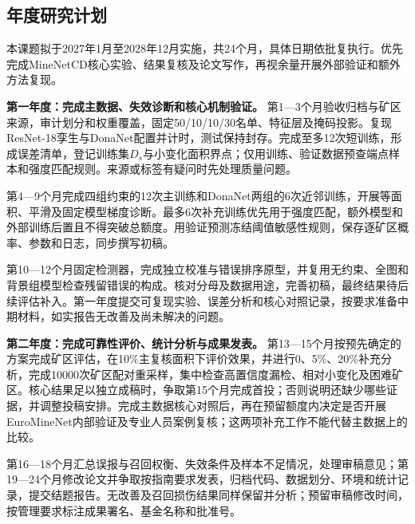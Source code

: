 \subsection{年度研究计划}
本课题拟于2027年1月至2028年12月实施，共24个月，具体日期依批复执行。优先完成MineNetCD核心实验、结果复核及论文写作，再视余量开展外部验证和额外方法复现。

\textbf{第一年度：完成主数据、失效诊断和核心机制验证。}
第1—3个月验收归档与矿区来源，审计划分和权重覆盖，固定50/10/10/30名单、特征层及掩码投影。复现ResNet-18孪生与DonaNet配置并计时，测试保持封存。完成至多12次短训练，形成误差清单，登记训练集$D_s$与小变化面积界点；仅用训练、验证数据预查端点样本和强度匹配规则。来源或标签有疑问时先处理质量问题。

第4—9个月完成四组约束的12次主训练和DonaNet两组的6次近邻训练，开展等面积、平滑及固定模型梯度诊断。最多6次补充训练优先用于强度匹配，额外模型和外部训练后置且不得突破总额度。用验证预测冻结阈值敏感性规则，保存逐矿区概率、参数和日志，同步撰写初稿。

第10—12个月固定检测器，完成独立校准与错误排序原型，并复用无约束、全图和背景组模型检查残留错误的构成。核对分母及数据用途，完善初稿，最终结果待后续评估补入。第一年度提交可复现实验、误差分析和核心对照记录，按要求准备中期材料，如实报告无改善及尚未解决的问题。

\textbf{第二年度：完成可靠性评价、统计分析与成果发表。}
第13—15个月按预先确定的方案完成矿区评估，在10\%主复核面积下评价效果，并进行0、5\%、20\%补充分析，完成10000次矿区配对重采样，集中检查高置信度漏检、相对小变化及困难矿区。核心结果足以独立成稿时，争取第15个月完成首投；否则说明还缺少哪些证据，并调整投稿安排。完成主数据核心对照后，再在预留额度内决定是否开展EuroMineNet内部验证及专业人员案例复核；这两项补充工作不能代替主数据上的比较。

第16—18个月汇总误报与召回权衡、失效条件及样本不足情况，处理审稿意见；第19—24个月修改论文并争取按指南要求发表，归档代码、数据划分、环境和统计记录，提交结题报告。无改善及召回损伤结果同样保留并分析；预留审稿修改时间，按管理要求标注成果署名、基金名称和批准号。

